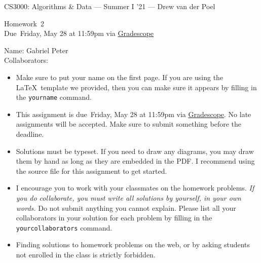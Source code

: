 \documentclass[11pt]{article}
\newcommand{\yourname}{Gabriel Peter}
\newcommand{\yourcollaborators}{}
\theoremstyle{definition}
\newcommand{\instructor}{Drew van der Poel}
\newcommand{\hwnum}{2}
\newcommand{\hwdue}{Friday, May 28 at 11:59pm via \href{https://gradescope.com/courses/266585}{Gradescope}}
\theoremstyle{theorem}
\begin{document}
{\Large 
\begin{center}{CS3000: Algorithms \& Data} --- Summer I '21 --- \instructor \end{center}}
{\large
\vspace{10pt}
\noindent Homework~\hwnum \vspace{2pt}\\
Due~\hwdue}

\bigskip
{\large
\noindent Name: \yourname \vspace{2pt}\\ Collaborators: \yourcollaborators}

\vspace{15pt}
\begin{itemize}

\item Make sure to put your name on the first page.  If you are using the \LaTeX~template we provided, then you can make sure it appears by filling in the \texttt{yourname} command.

\item This assignment is due~\hwdue.  No late assignments will be accepted.  Make sure to submit something before the deadline.

\item Solutions must be typeset.  If you need to draw any diagrams, you may draw them by hand as long as they are embedded in the PDF.  I recommend using the source file for this assignment to get started.

\item I encourage you to work with your classmates on the homework problems. \emph{If you do collaborate, you must write all solutions by yourself, in your own words.}  Do not submit anything you cannot explain.  Please list all your collaborators in your solution for each problem by filling in the \texttt{yourcollaborators} command.

\item Finding solutions to homework problems on the web, or by asking students not enrolled in the class is strictly forbidden.

\end{itemize}



\newpage
\end{document}
